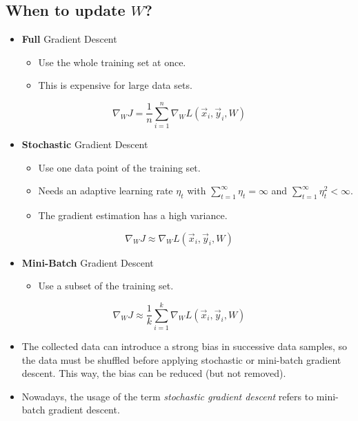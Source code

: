 		\subsection{When to update \(W\)?}
			\begin{itemize}
				\item \textbf{Full} Gradient Descent
					\begin{itemize}
						\item Use the whole training set at once.
						\item This is expensive for large data sets.
					\end{itemize}
			\end{itemize}
			\begin{equation}
				\nabla_W J = \frac{1}{n} \sum_{i = 1}^{n} \nabla_W L(\vec{x}_i, \vec{y}_i, W)
			\end{equation}
			\begin{itemize}
				\item \textbf{Stochastic} Gradient Descent
					\begin{itemize}
						\item Use one data point of the training set.
						\item Needs an adaptive learning rate \( \eta_t \) with \( \sum_{t = 1}^{\infty} \eta_t = \infty \) and \( \sum_{t = 1}^{\infty} \eta_t^2 < \infty \).
						\item The gradient estimation has a high variance.
					\end{itemize}
			\end{itemize}
			\begin{equation}
				\nabla_W J \approx \nabla_W L(\vec{x}_i, \vec{y}_i, W)
			\end{equation}
			\begin{itemize}
				\item \textbf{Mini-Batch} Gradient Descent
					\begin{itemize}
						\item Use a subset of the training set.
					\end{itemize}
			\end{itemize}
			\begin{equation}
				\nabla_W J \approx \frac{1}{k} \sum_{i = 1}^{k} \nabla_W L(\vec{x}_i, \vec{y}_i, W)
			\end{equation}
			\begin{itemize}
				\item The collected data can introduce a strong bias in successive data samples, so the data must be shuffled before applying stochastic or mini-batch gradient descent. This way, the bias can be reduced (but not removed).
				\item Nowadays, the usage of the term \emph{stochastic gradient descent} refers to mini-batch gradient descent.
			\end{itemize}

